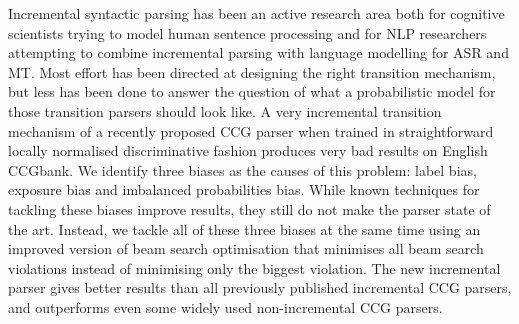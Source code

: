 Incremental syntactic parsing has been an active research area both for cognitive scientists trying to model human sentence processing and for NLP researchers attempting to combine incremental parsing with language modelling for ASR and MT.  Most effort has   been directed at designing the right transition mechanism, but less has been done to answer the question of what a probabilistic model for those transition parsers should look like. A very incremental transition mechanism of a recently proposed CCG parser when trained in straightforward locally normalised discriminative fashion produces very bad results on English CCGbank. We identify three biases as the causes of this problem: label bias, exposure bias and imbalanced probabilities bias. While known techniques for tackling these biases improve results, they still do not make the parser state of the art. Instead, we tackle all of these three biases at the same time using an improved version of beam search optimisation that minimises all beam search violations instead of minimising only the biggest violation. The new incremental parser gives better results than all previously published incremental CCG parsers, and outperforms even some widely used non-incremental CCG parsers.
